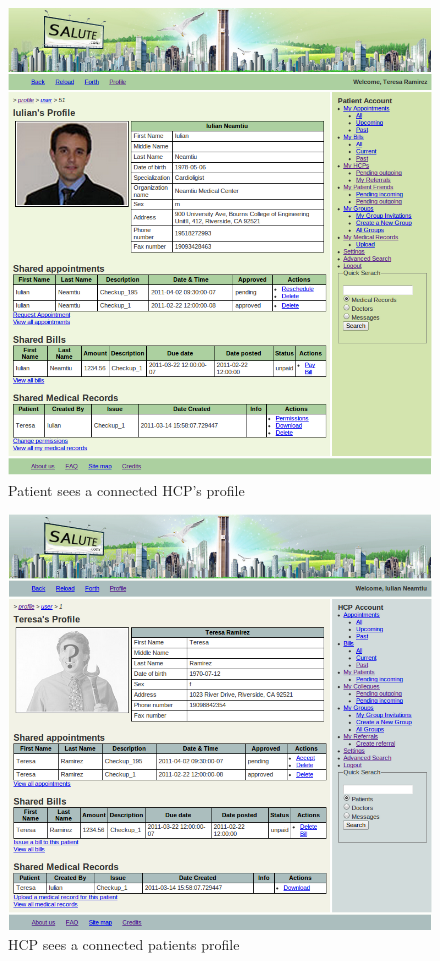 \begin{figure}
\includegraphics[scale=0.6]{screenshots/patient_sees_hcp_profile.png}
\caption{Patient sees a connected HCP's profile}
\end{figure}

\begin{figure}
\includegraphics[scale=0.6]{screenshots/hcp_sees_patient_profile.png}
\caption{HCP sees a connected patients profile}
\end{figure}

